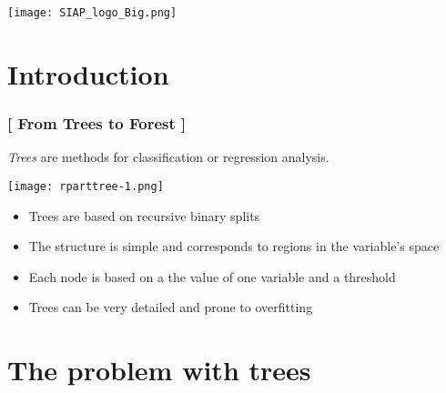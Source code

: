 \documentclass[xcolor=x11names,compress, handhouts]{beamer}
\renewcommand{\(}{\begin{columns}}
\renewcommand{\)}{\end{columns}}
\newcommand{\<}[1]{\begin{column}{#1}}
\renewcommand{\>}{\end{column}}
\begin{document}
\begin{frame}
\Large{ \color{siap}{Machine Learning for Official Statistics \& SDGs}}

\hspace{1cm}


\hspace{2cm}
\begin{center}

\texttt{[image: SIAP\_logo\_Big.png]}

\end{center}
\end{frame}



\section{Introduction}


\begin{frame} %
\frametitle{\textcolor{brique}{[  From Trees to Forest  ]}}
\textit{Trees} are methods for classification or regression analysis.\\
\begin{center} \texttt{[image: rparttree-1.png]} \end{center}
\pause
\begin{itemize}
  \item Trees are based on  recursive binary splits
  \item The structure is simple and corresponds to regions in the variable's space
  \item Each node is based on a the value of one variable  and a threshold
  \item Trees can be very detailed and prone to overfitting
\end{itemize}
\end{frame}

\section{The problem with trees}
\end{document}
